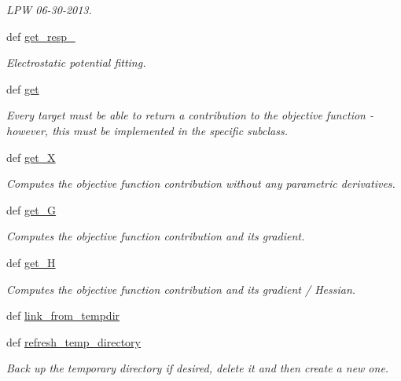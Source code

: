 \begin{DoxyCompactItemize}
\begin{DoxyCompactList}\small\item\em \-L\-P\-W 06-\/30-\/2013. \end{DoxyCompactList}\item 
def \hyperlink{classforcebalance_1_1abinitio_1_1AbInitio_abfe50569805218075c5942fd3be8bbe7}{get\-\_\-resp\-\_\-}
\begin{DoxyCompactList}\small\item\em \-Electrostatic potential fitting. \end{DoxyCompactList}\item 
def \hyperlink{classforcebalance_1_1abinitio_1_1AbInitio_a2bb3ed7209707f688ec8b731392466b5}{get}
\begin{DoxyCompactList}\small\item\em \-Every target must be able to return a contribution to the objective function -\/ however, this must be implemented in the specific subclass. \end{DoxyCompactList}\item 
def \hyperlink{classforcebalance_1_1target_1_1Target_a606dd136f195c267c05a2455405e5949}{get\-\_\-\-X}
\begin{DoxyCompactList}\small\item\em \-Computes the objective function contribution without any parametric derivatives. \end{DoxyCompactList}\item 
def \hyperlink{classforcebalance_1_1target_1_1Target_afa8cc38c8bba8861c072e789717aa049}{get\-\_\-\-G}
\begin{DoxyCompactList}\small\item\em \-Computes the objective function contribution and its gradient. \end{DoxyCompactList}\item 
def \hyperlink{classforcebalance_1_1target_1_1Target_a1d2ee27fe86a09769c1816af23b09adb}{get\-\_\-\-H}
\begin{DoxyCompactList}\small\item\em \-Computes the objective function contribution and its gradient / \-Hessian. \end{DoxyCompactList}\item 
def \hyperlink{classforcebalance_1_1target_1_1Target_a5aa4958cea0a48138511567a076c5a82}{link\-\_\-from\-\_\-tempdir}
\item 
def \hyperlink{classforcebalance_1_1target_1_1Target_afe815eafab06ac92f10bbf4b88ad95c8}{refresh\-\_\-temp\-\_\-directory}
\begin{DoxyCompactList}\small\item\em \-Back up the temporary directory if desired, delete it and then create a new one. \end{DoxyCompactList}\item 

\end{DoxyCompactItemize}
